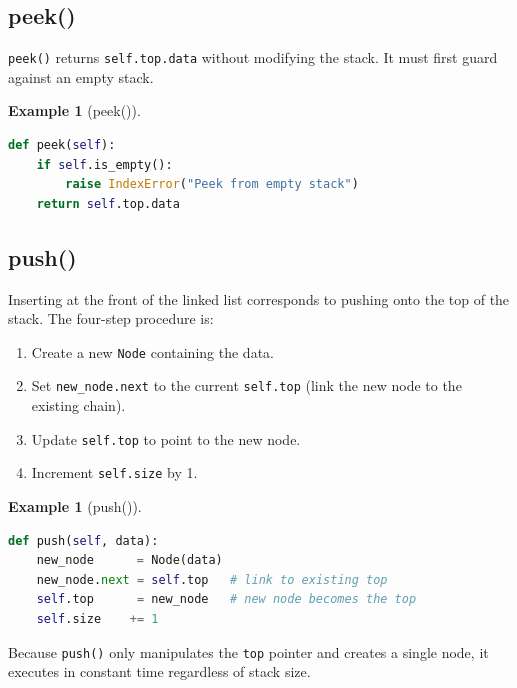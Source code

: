 \documentclass[11pt, a4paper, notitlepage]{report}
\theoremstyle{definition}
\theoremstyle{remark}
\theoremstyle{definition}
\newtheorem{example}[theorem]{Example}
\begin{document}
\subsection{peek()}
\label{subsec:stack-peek}

\texttt{peek()} returns \texttt{self.top.data} without modifying the stack.
It must first guard against an empty stack.

\begin{example}[peek()]
\label{ex:stack-peek}
\leavevmode
\begin{lstlisting}[language=Python]
def peek(self):
    if self.is_empty():
        raise IndexError("Peek from empty stack")
    return self.top.data
\end{lstlisting}
\end{example}

\subsection{push()}
\label{subsec:stack-push}

Inserting at the front of the linked list corresponds to pushing onto the top of
the stack. The four-step procedure is:

\begin{enumerate}
  \item Create a new \texttt{Node} containing the data.
  \item Set \texttt{new\_node.next} to the current \texttt{self.top} (link the new
        node to the existing chain).
  \item Update \texttt{self.top} to point to the new node.
  \item Increment \texttt{self.size} by 1.
\end{enumerate}

\begin{example}[push()]
\label{ex:stack-push}
\leavevmode
\begin{lstlisting}[language=Python]
def push(self, data):
    new_node      = Node(data)
    new_node.next = self.top   # link to existing top
    self.top      = new_node   # new node becomes the top
    self.size    += 1
\end{lstlisting}
\end{example}

\begin{keyresult}[title={Key Result: push() is O(1)}]
Because \texttt{push()} only manipulates the \texttt{top} pointer and creates a
single node, it executes in constant time regardless of stack size.
\end{keyresult}
\end{document}
